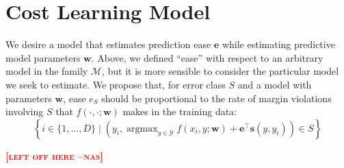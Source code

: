 \documentclass{article} %
\DeclareMathOperator*{\argmax}{argmax}
\newcommand{\nascomment}[1]{\textcolor{red}{\textsc{\textbf{[#1 --nas]}}}}
\begin{document}


\section{Cost Learning Model}
\label{costLearningModel}

We desire a model that estimates prediction ease $\mathbf{e}$ while
estimating
predictive model parameters $\mathbf{w}$.  Above, we defined ``ease''
with respect to an arbitrary model in the family $\mathcal{M}$, but it
is more sensible to consider the particular model we seek to
estimate.  We propose that, for error class $S$ and a model with
parameters $\mathbf{w}$, ease $e_S$ should be proportional to the rate
of margin violations involving $S$ that $f(\cdot, \cdot; \mathbf{w})$ makes in the
training data:
\begin{equation}
\left\{ i  \in \{1,\ldots, D\} \mid \left(y_i, \textstyle \argmax_{y \in \mathcal{Y}} f(x_i, y ; \mathbf{w}) +
\mathbf{e}^\top \mathbf{s}(y, y_i)\right) \in S\right\}
\end{equation}

\nascomment{left off here}
\end{document}
